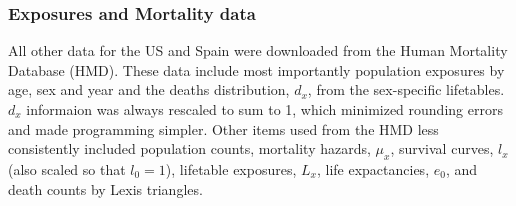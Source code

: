 \subsubsection{Exposures and Mortality data}

All other data for the US and Spain were downloaded from the Human Mortality
Database (HMD)\citep{wilmoth2007methods}. These data include most importantly population
exposures by age, sex and year and the deaths distribution, $d_x$, from the sex-specific lifetables. $d_x$ 
informaion was always rescaled to sum to 1, which minimized rounding
errors and made programming simpler. Other items used from the HMD less
consistently included population counts, mortality hazards, $\mu_x$, survival
curves, $l_x$ (also scaled so that $l_0 = 1$), lifetable exposures, $L_x$, life expactancies, $e_0$,
and death counts by Lexis triangles.

